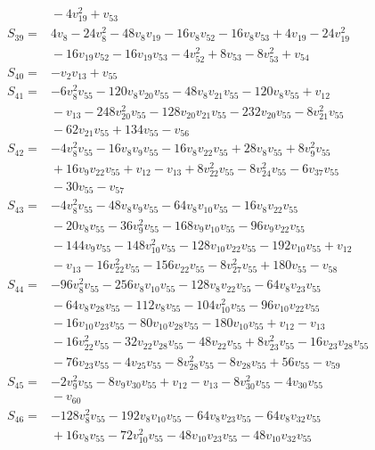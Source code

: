 \begin{align*}
&{}-4v_{19}^{2}+v_{53}\\
S_{39}={}&4v_{8}-24v_{8}^{2}-48v_{8}v_{19}-16v_{8}v_{52}-16v_{8}v_{53}+4v_{19}-24v_{19}^{2}\\
&{}-16v_{19}v_{52}-16v_{19}v_{53}-4v_{52}^{2}+8v_{53}-8v_{53}^{2}+v_{54}\\
S_{40}={}&-v_{2}v_{13}+v_{55}\\
S_{41}={}&-6v_{8}^{2}v_{55}-120v_{8}v_{20}v_{55}-48v_{8}v_{21}v_{55}-120v_{8}v_{55}+v_{12}\\
&{}-v_{13}-248v_{20}^{2}v_{55}-128v_{20}v_{21}v_{55}-232v_{20}v_{55}-8v_{21}^{2}v_{55}\\
&{}-62v_{21}v_{55}+134v_{55}-v_{56}\\
S_{42}={}&-4v_{8}^{2}v_{55}-16v_{8}v_{9}v_{55}-16v_{8}v_{22}v_{55}+28v_{8}v_{55}+8v_{9}^{2}v_{55}\\
&{}+16v_{9}v_{22}v_{55}+v_{12}-v_{13}+8v_{22}^{2}v_{55}-8v_{24}^{2}v_{55}-6v_{37}v_{55}\\
&{}-30v_{55}-v_{57}\\
S_{43}={}&-4v_{8}^{2}v_{55}-48v_{8}v_{9}v_{55}-64v_{8}v_{10}v_{55}-16v_{8}v_{22}v_{55}\\
&{}-20v_{8}v_{55}-36v_{9}^{2}v_{55}-168v_{9}v_{10}v_{55}-96v_{9}v_{22}v_{55}\\
&{}-144v_{9}v_{55}-148v_{10}^{2}v_{55}-128v_{10}v_{22}v_{55}-192v_{10}v_{55}+v_{12}\\
&{}-v_{13}-16v_{22}^{2}v_{55}-156v_{22}v_{55}-8v_{27}^{2}v_{55}+180v_{55}-v_{58}\\
S_{44}={}&-96v_{8}^{2}v_{55}-256v_{8}v_{10}v_{55}-128v_{8}v_{22}v_{55}-64v_{8}v_{23}v_{55}\\
&{}-64v_{8}v_{28}v_{55}-112v_{8}v_{55}-104v_{10}^{2}v_{55}-96v_{10}v_{22}v_{55}\\
&{}-16v_{10}v_{23}v_{55}-80v_{10}v_{28}v_{55}-180v_{10}v_{55}+v_{12}-v_{13}\\
&{}-16v_{22}^{2}v_{55}-32v_{22}v_{28}v_{55}-48v_{22}v_{55}+8v_{23}^{2}v_{55}-16v_{23}v_{28}v_{55}\\
&{}-76v_{23}v_{55}-4v_{25}v_{55}-8v_{28}^{2}v_{55}-8v_{28}v_{55}+56v_{55}-v_{59}\\
S_{45}={}&-2v_{9}^{2}v_{55}-8v_{9}v_{30}v_{55}+v_{12}-v_{13}-8v_{30}^{2}v_{55}-4v_{30}v_{55}\\
&{}-v_{60}\\
S_{46}={}&-128v_{8}^{2}v_{55}-192v_{8}v_{10}v_{55}-64v_{8}v_{23}v_{55}-64v_{8}v_{32}v_{55}\\
&{}+16v_{8}v_{55}-72v_{10}^{2}v_{55}-48v_{10}v_{23}v_{55}-48v_{10}v_{32}v_{55}\\

\end{align*}
